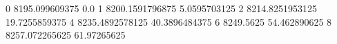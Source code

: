 0 8195.099609375 0.0
1 8200.1591796875 5.0595703125
2 8214.8251953125 19.7255859375
4 8235.4892578125 40.3896484375
6 8249.5625 54.462890625
8 8257.072265625 61.97265625

